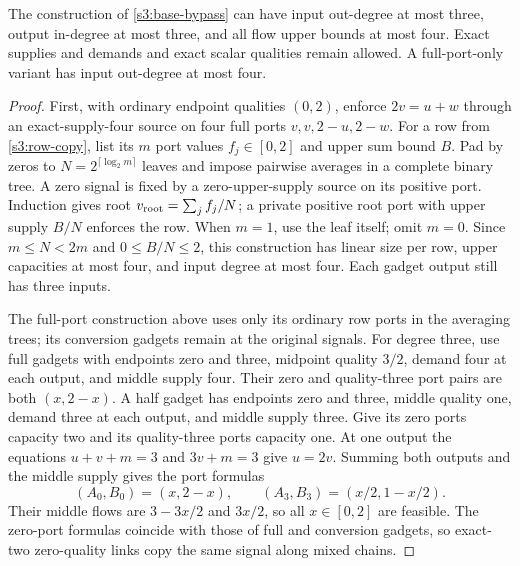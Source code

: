 \begin{lemma}\label{s3:half}
The construction of \cref{s3:base-bypass} can have input out-degree at
most three, output in-degree at most three, and all flow upper bounds at
most four. Exact supplies and demands and exact scalar qualities remain
allowed. A full-port-only variant has input out-degree at most four.
\end{lemma}
\begin{proof}
First, with ordinary endpoint qualities $(0,2)$, enforce
$2v=u+w$ through an exact-supply-four source on four full ports
$v,v,2-u,2-w$. For a row from \cref{s3:row-copy}, list its $m$ port
values $f_j\in[0,2]$ and upper sum bound $B$. Pad by zeros to
$N=2^{\lceil\log_2m\rceil}$ leaves and impose pairwise averages in a
complete binary tree. A zero signal is fixed by a zero-upper-supply
source on its positive port. Induction gives root
$v_{\rm root}=\sum_jf_j/N$; a private positive root port with upper
supply $B/N$ enforces the row. When $m=1$, use the leaf itself; omit
$m=0$. Since $m\le N<2m$ and $0\le B/N\le2$, this construction has
linear size per row, upper capacities at most four, and input degree
at most four. Each gadget output still has three inputs.

The full-port construction above uses only its ordinary row ports in
the averaging trees; its conversion gadgets remain at the original
signals. For degree three, use full gadgets with endpoints zero and three,
midpoint quality $3/2$, demand four at each output, and middle supply
four. Their zero and quality-three port pairs are both $(x,2-x)$.
A half gadget has endpoints zero and three, middle quality one,
demand three at each output, and middle supply three. Give its zero
ports capacity two and its quality-three ports capacity one. At one
output the equations $u+v+m=3$ and $3v+m=3$ give $u=2v$.
Summing both outputs and the middle supply gives the port formulas
\begin{equation}
 (A_0,B_0)=(x,2-x),\qquad
 (A_3,B_3)=(x/2,1-x/2).\label{s3:half-ports}
\end{equation}
Their middle flows are $3-3x/2$ and $3x/2$, so all $x\in[0,2]$
are feasible. The zero-port formulas coincide with those of full and
conversion gadgets, so exact-two zero-quality links copy the same
signal along mixed chains.


\end{proof}
